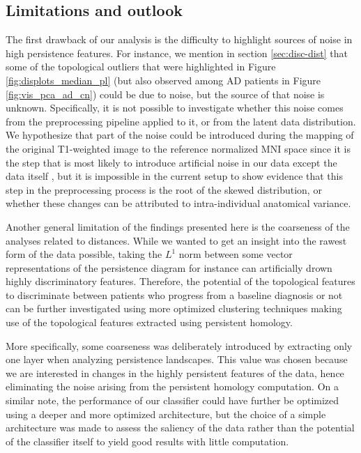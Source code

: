 \documentclass{article}
\begin{document}
\subsection{Limitations and outlook}

The first drawback of our analysis is the difficulty to highlight sources of noise in high
persistence features. For instance, we mention in section \ref{sec:disc-dist} that some of the
topological outliers that were highlighted in Figure \ref{fig:displots_median_pl} (but also observed
among AD patients in Figure \ref{fig:vis_pca_ad_cn}) could be due to noise, but the source of that
noise is unknown. Specifically, it is not possible to investigate whether this noise comes from the
preprocessing pipeline applied to it, or from the latent data distribution. We hypothesize that part
of the noise could be introduced during the mapping of the original T1-weighted image to the
reference normalized MNI space since it is the step that is most likely to introduce artificial
noise in our data except the data itself \citep{collins19943d}, but it is impossible in the
current setup to show evidence that this step in the preprocessing process is the root of the skewed
distribution, or whether these changes can be attributed to intra-individual anatomical variance.

Another general limitation of the findings presented here is the coarseness of the analyses related
to distances. While we wanted to get an insight into the rawest form of the data possible, taking
the $L^1$ norm between some vector representations of the persistence diagram for instance can
artificially drown highly discriminatory features. Therefore, the potential of the topological
features to discriminate between patients who progress from a baseline diagnosis or not can be
further investigated using more optimized clustering techniques making use of the topological
features extracted using persistent homology.

More specifically, some coarseness was deliberately introduced by extracting only one layer when
analyzing persistence landscapes. This value was chosen because we are interested in changes in the
highly persistent features of the data, hence eliminating the noise arising from the persistent
homology computation. On a similar note, the performance of our classifier could have further be
optimized using a deeper and more optimized architecture, but the choice of a simple architecture
was made to assess the saliency of the data rather than the potential of the classifier itself to
yield good results with little computation.
\end{document}

